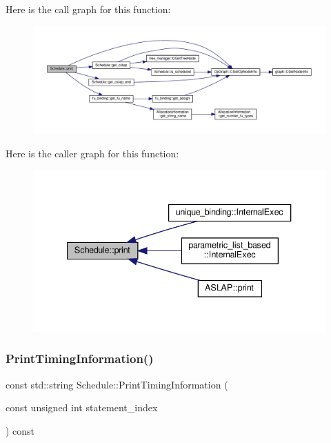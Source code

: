 Here is the call graph for this function\+:
\nopagebreak
\begin{figure}[H]
\begin{center}
\leavevmode
\includegraphics[width=350pt]{df/d61/classSchedule_ad25e768e9aeea647c95939f49b46ce7a_cgraph}
\end{center}
\end{figure}
Here is the caller graph for this function\+:
\nopagebreak
\begin{figure}[H]
\begin{center}
\leavevmode
\includegraphics[width=340pt]{df/d61/classSchedule_ad25e768e9aeea647c95939f49b46ce7a_icgraph}
\end{center}
\end{figure}
\mbox{\label{classSchedule_a6c882a9f405b563a05ad75371a982aab}} 
\subsubsection{\texorpdfstring{Print\+Timing\+Information()}{PrintTimingInformation()}}
{\footnotesize\ttfamily const std\+::string Schedule\+::\+Print\+Timing\+Information (\begin{DoxyParamCaption}\item[{const unsigned int}]{statement\+\_\+index }\end{DoxyParamCaption}) const}



